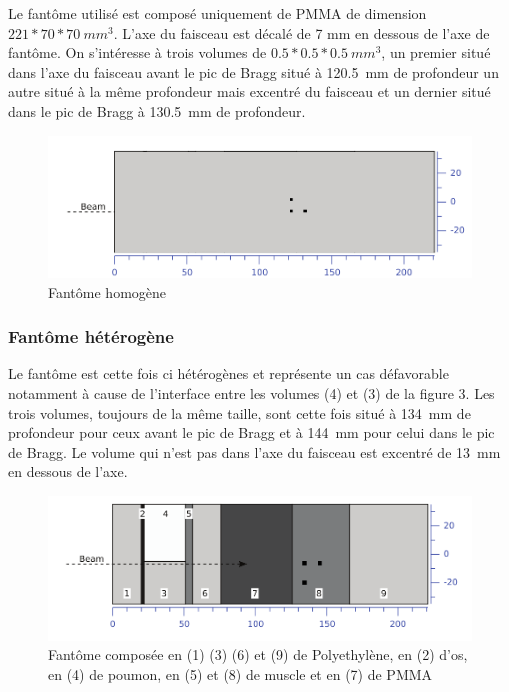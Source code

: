 \documentclass[11pt,a4paper,oldfontcommands]{memoir}
\begin{document}
Le fantôme utilisé est composé uniquement de PMMA de dimension $221*70*70~mm^3$. L'axe du faisceau est décalé de 7 mm en dessous de l'axe de fantôme. On s'intéresse à trois volumes de $0.5*0.5*0.5~mm^3$, un premier situé dans l'axe du faisceau avant le pic de Bragg situé à 120.5~mm de profondeur un autre situé à la même profondeur mais excentré du faisceau et un dernier situé dans le pic de Bragg à 130.5~mm de profondeur.\\
\begin{figure}[h!]
    \centering
    \includegraphics[scale = 0.3]{homo/homofant.png}
    \caption{Fantôme homogène}
    \label{fant homo}
\end{figure}{}



\openany
\subsubsection{Fantôme hétérogène}

Le fantôme est cette fois ci hétérogènes et représente un cas défavorable notamment à cause de l'interface entre les volumes (4) et (3) de la figure 3. Les trois volumes, toujours de la même taille, sont cette fois situé à 134~mm de profondeur pour ceux avant le pic de Bragg et à 144~mm pour celui dans le pic de Bragg. Le volume qui n'est pas dans l'axe du faisceau est excentré de 13~mm en dessous de l'axe. 

\begin{figure}[h]
    \centering
    \includegraphics[scale = 0.3]{Parodi/heterofant.png}
    \caption{Fantôme composée en (1) (3) (6) et (9) de Polyethylène, en (2) d'os, en (4) de poumon, en (5) et (8) de muscle et en (7) de PMMA}
    \label{hetero phant}
\end{figure}{}
\end{document}
